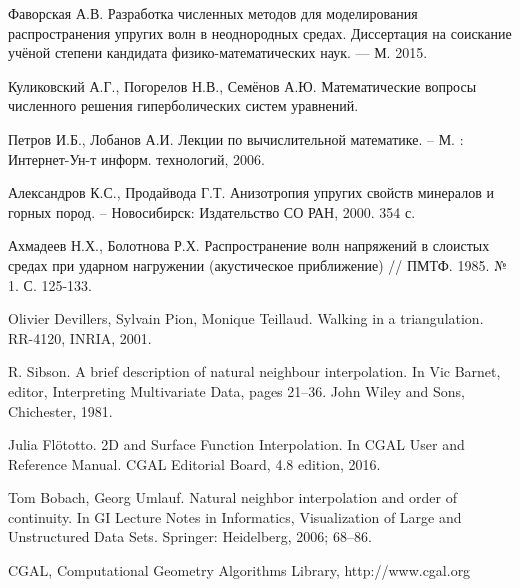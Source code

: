 \begin{thebibliography}{99}
 Фаворская А.В. Разработка численных методов для моделирования распространения упругих волн в неоднородных средах. Диссертация на соискание учёной степени кандидата физико-математических наук. — М. 2015.

 Куликовский А.Г., Погорелов Н.В., Семёнов А.Ю. Математические вопросы численного решения гиперболических систем уравнений.

 Петров И.Б., Лобанов А.И. Лекции по вычислительной математике. – М. : Интернет-Ун-т информ. технологий, 2006.

 Александров К.С., Продайвода Г.Т. Анизотропия упругих свойств минералов и горных пород. – Новосибирск: Издательство СО РАН, 2000. 354 с.

 Ахмадеев Н.Х., Болотнова Р.Х. Распространение волн напряжений в слоистых средах при ударном нагружении (акустическое приближение) // ПМТФ. 1985. № 1. С. 125-133.

 Olivier Devillers, Sylvain Pion, Monique Teillaud. Walking in a triangulation. RR-4120, INRIA, 2001.

 R. Sibson. A brief description of natural neighbour interpolation. In Vic Barnet, editor, Interpreting Multivariate Data, pages 21–36. John Wiley and Sons, Chichester, 1981.

 Julia Flötotto. 2D and Surface Function Interpolation. In CGAL User and Reference Manual. CGAL Editorial Board, 4.8 edition, 2016.

 Tom Bobach, Georg Umlauf. Natural neighbor interpolation and order of continuity. In GI Lecture Notes in Informatics, Visualization of Large and Unstructured Data Sets. Springer: Heidelberg, 2006; 68–86.

 CGAL, Computational Geometry Algorithms Library, http://www.cgal.org

\end{thebibliography}
